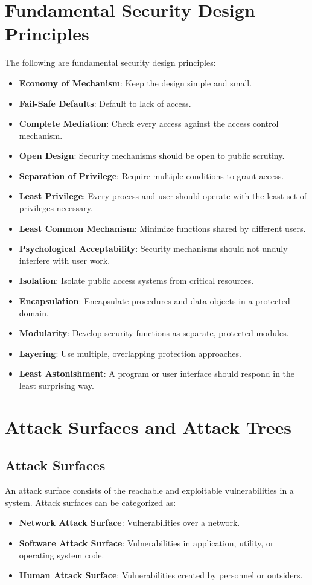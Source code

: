 \documentclass{article}
\begin{document}
\section{Fundamental Security Design Principles}
The following are fundamental security design principles:
\begin{itemize}
    \item \textbf{Economy of Mechanism}: Keep the design simple and small.
    \item \textbf{Fail-Safe Defaults}: Default to lack of access.
    \item \textbf{Complete Mediation}: Check every access against the access control mechanism.
    \item \textbf{Open Design}: Security mechanisms should be open to public scrutiny.
    \item \textbf{Separation of Privilege}: Require multiple conditions to grant access.
    \item \textbf{Least Privilege}: Every process and user should operate with the least set of privileges necessary.
    \item \textbf{Least Common Mechanism}: Minimize functions shared by different users.
    \item \textbf{Psychological Acceptability}: Security mechanisms should not unduly interfere with user work.
    \item \textbf{Isolation}: Isolate public access systems from critical resources.
    \item \textbf{Encapsulation}: Encapsulate procedures and data objects in a protected domain.
    \item \textbf{Modularity}: Develop security functions as separate, protected modules.
    \item \textbf{Layering}: Use multiple, overlapping protection approaches.
    \item \textbf{Least Astonishment}: A program or user interface should respond in the least surprising way.
\end{itemize}

\section{Attack Surfaces and Attack Trees}
\subsection{Attack Surfaces}
An attack surface consists of the reachable and exploitable vulnerabilities in a system. Attack surfaces can be categorized as:
\begin{itemize}
    \item \textbf{Network Attack Surface}: Vulnerabilities over a network.
    \item \textbf{Software Attack Surface}: Vulnerabilities in application, utility, or operating system code.
    \item \textbf{Human Attack Surface}: Vulnerabilities created by personnel or outsiders.
\end{itemize}
\end{document}
